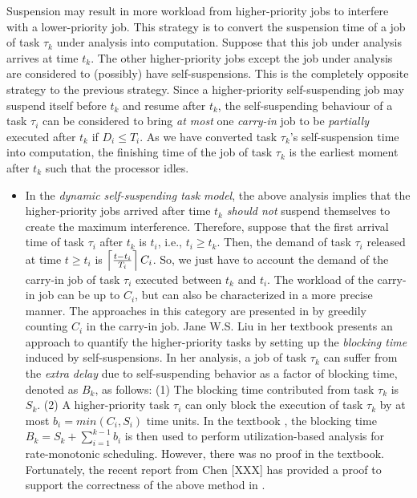 \begin{table}[t]
\begin{table}[t]
 Suspension may result in more workload from higher-priority jobs to interfere with a lower-priority job. This strategy is to convert the suspension time of a job of task $\tau_k$ under analysis into computation. Suppose that this job under analysis arrives at time $t_k$. The other higher-priority jobs except the job under analysis are considered to (possibly) have self-suspensions. This is the completely opposite strategy to the previous strategy. Since a higher-priority self-suspending job may suspend itself before $t_k$ and resume after $t_k$, the self-suspending behaviour of a task $\tau_i$ can be considered to bring \emph{at most} one \emph{carry-in} job to be \emph{partially} executed after $t_k$ if $D_i \leq T_i$. As we have converted task $\tau_k$'s self-suspension time into computation, the finishing time of the job of task $\tau_k$ is the earliest moment after $t_k$ such that the processor idles. 
\begin{itemize}
\item In the \emph{dynamic self-suspending task model}, the above analysis implies that the higher-priority jobs arrived after time $t_k$ \emph{should not} suspend themselves to create the maximum interference. Therefore, suppose that the first arrival time of task $\tau_i$ after $t_k$ is $t_i$, i.e., $t_i \geq t_k$. Then, the demand of task $\tau_i$ released at time $t \geq t_i$ is $\left\lceil{\frac{t-t_i}{T_i} }\right\rceil C_i$. So, we just have to account the demand of the carry-in job of task $\tau_i$ executed between $t_k$ and $t_i$. The workload of the carry-in job can be up to $C_i$, but can also be characterized in a more precise manner. The approaches in this category are presented in \cite{huangpass:dac2015,LiuChen:rtss2014} by greedily counting $C_i$ in the carry-in job. 
Jane W.S. Liu in her textbook \cite[Page 164-165]{Liu:2000:RS:518501} presents an approach to quantify the higher-priority tasks by setting up the \emph{blocking time} induced by self-suspensions. In her analysis, a job of task $\tau_k$ can suffer from the \emph{extra delay} due to self-suspending behavior as a factor of blocking time, denoted as $B_k$, as follows: (1) The blocking time contributed from task $\tau_k$ is $S_k$. (2) A higher-priority task $\tau_i$ can only block the execution of task $\tau_k$ by at most $b_i=min(C_i, S_i)$ time units. In the textbook \cite{Liu:2000:RS:518501}, the blocking time $B_k=S_k+\sum_{i=1}^{k-1} b_i$ is then used to perform utilization-based analysis for rate-monotonic scheduling. However, there was no proof in the textbook. Fortunately, the recent report from Chen [XXX] has provided a proof to support the correctness of the above method in \cite{Liu:2000:RS:518501}.


\end{itemize}
\end{table}
\end{table}

